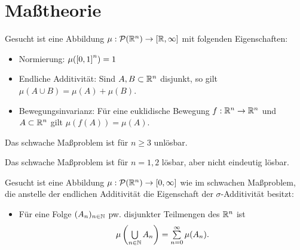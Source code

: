 \documentclass{cheat-sheet}
\newcommand{\PS}{\mathcal{P}} %
\theoremstyle{definition}
\begin{document}


\section{Maßtheorie}


\begin{prob}
  Gesucht ist eine Abbildung $\mu : \PS(\R^n) \to [\R, \infty]$ mit folgenden Eigenschaften:
  \begin{itemize}
    \item Normierung: $\mu(\left[ 0, 1 \right]^n) = 1$
    \item Endliche Additivität: Sind $A, B \subset \mathbb{R}^n$ disjunkt, so gilt $\mu(A \cup B) = \mu(A) + \mu(B)$.
    \item Bewegungsinvarianz: Für eine euklidische Bewegung $f : \mathbb{R}^n \to \mathbb{R}^n$ und $A \subset \mathbb{R}^n$ gilt $\mu(f(A)) = \mu(A)$.
  \end{itemize}
\end{prob}

\begin{satz}[Hausdorff]
  Das schwache Maßproblem ist für $n \geq 3$ unlösbar.
\end{satz}

\begin{satz}[Banach]
  Das schwache Maßproblem ist für $n = 1, 2$ lösbar, aber nicht eindeutig lösbar.
\end{satz}


\begin{prob}
  Gesucht ist eine Abbildung $\mu : \PS(\R^n) \to \cinterval{0}{\infty}$ wie im schwachen Maßproblem, die anstelle der endlichen Additivität die Eigenschaft der $\sigma$-Additivität besitzt:
  \begin{itemize}
    \item Für eine Folge $(A_n)_{n \in \mathbb{N}}$ pw. disjunkter Teilmengen des $\mathbb{R}^n$ ist
      \[ \mu\left(\bigcup_{n \in \N} A_n\right) = \sum_{n=0}^\infty \mu(A_n). \]
  \end{itemize}
\end{prob}
\end{document}
